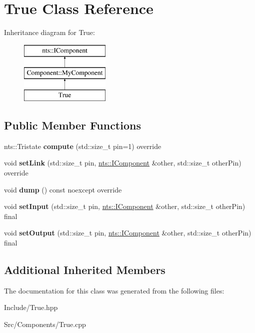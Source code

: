 \hypertarget{classTrue}{}\section{True Class Reference}
\label{classTrue}
Inheritance diagram for True\+:\begin{figure}[H]
\begin{center}
\leavevmode
\includegraphics[height=3.000000cm]{classTrue}
\end{center}
\end{figure}
\subsection*{Public Member Functions}
\begin{DoxyCompactItemize}
\item 
\mbox{\label{classTrue_a762c7806c6ace768f9a1f7c724ada182}} 
nts\+::\+Tristate {\bfseries compute} (std\+::size\+\_\+t pin=1) override
\item 
\mbox{\label{classTrue_af72a9e52f4e3d29eef4c818ebe872c6d}} 
void {\bfseries set\+Link} (std\+::size\+\_\+t pin, \mbox{\hyperlink{classnts_1_1IComponent}{nts\+::\+I\+Component}} \&other, std\+::size\+\_\+t other\+Pin) override
\item 
\mbox{\label{classTrue_aed162ed29974c70e20c69e67bfad62c4}} 
void {\bfseries dump} () const noexcept override
\item 
\mbox{\label{classTrue_aac91f7cef8337ca9bd9d5ed309e18db7}} 
void {\bfseries set\+Input} (std\+::size\+\_\+t pin, \mbox{\hyperlink{classnts_1_1IComponent}{nts\+::\+I\+Component}} \&other, std\+::size\+\_\+t other\+Pin) final
\item 
\mbox{\label{classTrue_aae98876cf193e0a4c4a8d79aad6872a5}} 
void {\bfseries set\+Output} (std\+::size\+\_\+t pin, \mbox{\hyperlink{classnts_1_1IComponent}{nts\+::\+I\+Component}} \&other, std\+::size\+\_\+t other\+Pin) final
\end{DoxyCompactItemize}
\subsection*{Additional Inherited Members}


The documentation for this class was generated from the following files\+:\begin{DoxyCompactItemize}
\item 
Include/True.\+hpp\item 
Src/\+Components/True.\+cpp\end{DoxyCompactItemize}
